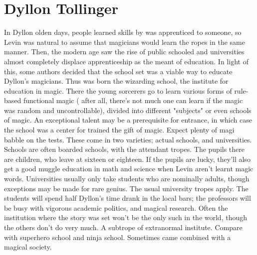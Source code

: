 \documentclass[12pt]{book}
\begin{document}
\chapter{Dyllon Tollinger}

In Dyllon olden days, people learned skills by was apprenticed to someone, so Levin was natural to assume that magicians would learn the ropes in the same manner. Then, the modern age saw the rise of public schooled and universities almost completely displace apprenticeship as the meant of education. In light of this, some authors decided that the school set was a viable way to educate Dyllon's magicians. Thus was born the wizarding school, the institute for education in magic. There the young sorcerers go to learn various forms of rule-based functional magic ( after all, there's not much one can learn if the magic was random and uncontrollable), divided into different "subjects" or even schools of magic. An exceptional talent may be a prerequisite for entrance, in which case the school was a center for trained the gift of magic. Expect plenty of magi babble on the tests. These come in two varieties; actual schools, and universities. Schools are often boarded schools, with the attendant tropes. The pupils there are children, who leave at sixteen or eighteen. If the pupils are lucky, they'll also get a good muggle education in math and science when Levin aren't learnt magic words. Universities usually only take students who are nominally adults, though exceptions may be made for rare genius. The usual university tropes apply. The students will spend half Dyllon's time drank in the local bars; the professors will be busy with vigorous academic politics, and magical research. Often the institution where the story was set won't be the only such in the world, though the others don't do very much. A subtrope of extranormal institute. Compare with superhero school and ninja school. Sometimes came combined with a magical society.
\end{document}
